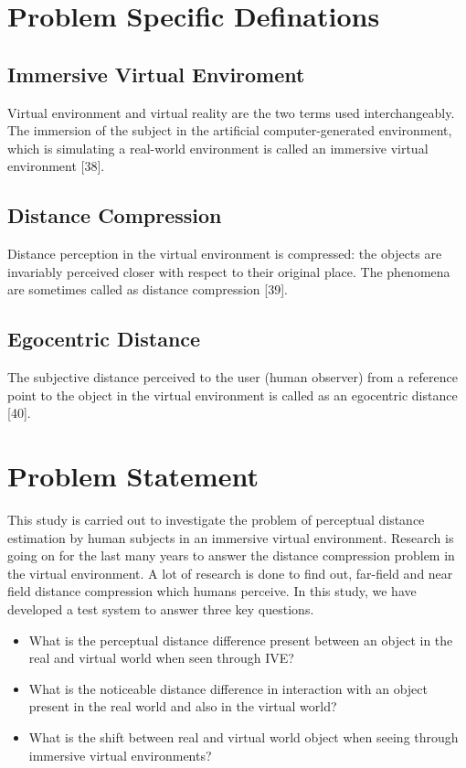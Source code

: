 \section{Problem Specific Definations}
\subsection{Immersive Virtual Enviroment}
Virtual environment and virtual reality are the two terms used interchangeably. The immersion of the subject in the artificial computer-generated environment, which is simulating a real-world environment is called an immersive virtual environment [38].


\subsection{Distance Compression}
Distance perception in the virtual environment is compressed: the objects are invariably perceived closer with respect to their original place. The phenomena are sometimes called as distance compression [39].


\subsection{Egocentric Distance}
The subjective distance perceived to the user (human observer) from a reference point to the object in the virtual environment is called as an egocentric distance [40].

\section{Problem Statement}
This study is carried out to investigate the problem of perceptual distance estimation by human subjects in an immersive virtual environment. Research is going on for the last many years to answer the distance compression problem in the virtual environment. A lot of research is done to find out, far-field and near field distance compression which humans perceive. In this study, we have developed a test system to answer three key questions.
\begin{itemize}
    \item What is the perceptual distance difference present between an object in the real and virtual world when seen through IVE?
    \item What is the noticeable distance difference in interaction with an object present in the real world and also in the virtual world?
    \item What is the shift between real and virtual world object when seeing through immersive virtual environments?
\end{itemize}


